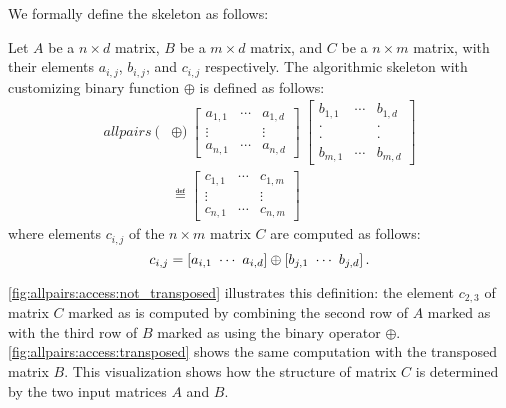 We formally define the \allpairs skeleton as follows:

\begin{definition}
  \label{def:allpairs}
  Let $A$ be a $n\times d$ matrix, $B$ be a $m\times d$ matrix, and $C$ be a $n\times m$ matrix, with their elements $a_{i,j}$, $b_{i,j}$, and $c_{i,j}$ respectively.
  The algorithmic skeleton \allpairs with customizing binary function $\oplus$ is defined as follows:
  \begin{equation*}
    \begin{split}
    allpairs\ (&\oplus)\
      \left[ \begin{array}{ccc} a_{1,1} & \cdots & a_{1,d}\\[.25em] \vdots & & \vdots\\[.25em] a_{n,1} & \cdots & a_{n,d} \end{array}\right]\ %
      \left[ \begin{array}{ccc} b_{1,1} & \cdots & b_{1,d}\\[-.25em] \cdot & & \cdot\\[-.75em] \cdot & & \cdot\\[-.25em] b_{m,1} & \cdots & b_{m,d} \end{array}\right]%
      \\
    &\eqdef \left[ \begin{array}{ccc} c_{1,1} & \cdots & c_{1,m}\\[.25em] \vdots & & \vdots\\[.25em] c_{n,1} & \cdots & c_{n,m} \end{array} \right]
    \end{split}
  \end{equation*}
  where elements $c_{i,j}$ of the $n\times m$ matrix $C$ are computed as follows:
  \[
    c_{i,j} = \left[a_{i,1}\ \cdots\ a_{i,d}\right] \oplus \left[b_{j,1}\ \cdots\ b_{j,d}\right] .
  \]
\end{definition}

\autoref{fig:allpairs:access:not_transposed} illustrates this definition:
the element $c_{2,3}$ of matrix $C$ marked as \circled{3} is computed by combining the second row of $A$ marked as  with the third row of $B$ marked as  using the binary operator $\oplus$.
\autoref{fig:allpairs:access:transposed} shows the same computation with the transposed matrix $B$.
This visualization shows how the structure of matrix $C$ is determined by the two input matrices $A$ and $B$.


